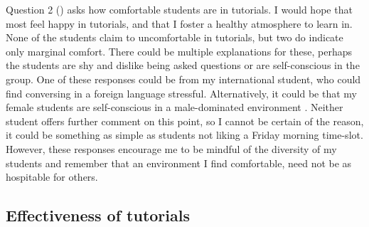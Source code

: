 Question 2 () asks how comfortable students are in tutorials. I would hope that most feel happy in tutorials, and that I foster a healthy atmosphere to learn in. None of the students claim to uncomfortable in tutorials, but two do indicate only marginal comfort. There could be multiple explanations for these, perhaps the students are shy and dislike being asked questions or are self-conscious in the group. One of these responses could be from my international student, who could find conversing in a foreign language stressful. Alternatively, it could be that my female students are self-conscious in a male-dominated environment \citep{Gonsalves2014,Gonsalves2014a}. Neither student offers further comment on this point, so I cannot be certain of the reason, it could be something as simple as students not liking a Friday morning time-slot. However, these responses encourage me to be mindful of the diversity of my students and remember that an environment I find comfortable, need not be as hospitable for others.

\subsection{Effectiveness of tutorials}\label{sec:tutorial-effect}

